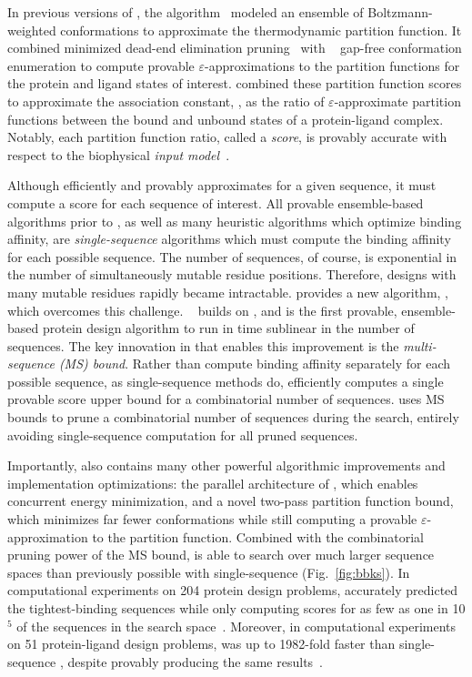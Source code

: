 \def\multisequencebound{MS\xspace}
\def\msbound{\multisequencebound}


\newcommand{\cut}[1]{}

In previous versions of \osprey, the \ks algorithm~\cite{K*} modeled an ensemble of Boltzmann-weighted conformations to approximate the thermodynamic partition function. It combined minimized dead-end elimination pruning~\cite{DEE} with \as~\cite{DEE,A*} gap-free conformation enumeration to compute provable $\varepsilon$-approximations to the partition functions for the protein and ligand states of interest. \ks combined these partition function scores to approximate the association constant, \ka, as the ratio of $\varepsilon$-approximate partition functions between the bound and unbound states of a protein-ligand complex. Notably, each partition function ratio, called a \ks \emph{score}, is provably accurate with respect to the biophysical \emph{input model}~\cite{K*,minDEE,iMinDEE}. 

Although \ks efficiently and provably approximates \ka for a given sequence, it must compute a \ks score for each sequence of interest. All provable ensemble-based algorithms prior to \bbks, as well as many heuristic algorithms which optimize binding affinity, are \emph{single-sequence} algorithms which must compute the binding affinity for each possible sequence. The number of sequences, of course, is exponential in the number of simultaneously mutable residue positions.  Therefore, designs with many mutable residues rapidly became intractable.  provides a new algorithm, \bbks, which overcomes this challenge. \bbks~\cite{BBK*} builds on \ks, and is the first provable, ensemble-based protein design algorithm to run in time sublinear in the number of sequences. The key innovation in \bbks that enables this improvement is the \emph{multi-sequence (\msbound) bound}. Rather than compute binding affinity separately for each possible sequence, as single-sequence methods do, \bbks efficiently computes a single provable \ks score upper bound for a combinatorial number of sequences. \bbks uses \msbound bounds to prune a combinatorial number of sequences during the search, entirely avoiding single-sequence computation for all pruned sequences.

Importantly, \bbks also contains many other powerful algorithmic improvements and implementation optimizations: the parallel architecture of \bbks, which enables concurrent energy minimization, and a novel two-pass partition function bound, which minimizes far fewer conformations while still computing a provable $\varepsilon$-approximation to the partition function. Combined with the combinatorial pruning power of the \msbound bound, \bbks is able to search over much larger sequence spaces than previously possible with single-sequence \ks (Fig.~\ref{fig:bbks}). In computational experiments on 204 protein design problems, \bbks accurately predicted the tightest-binding sequences while only computing \ks scores for as few as one in 10$^5$ of the sequences in the search space~\cite{BBK*}.  Moreover, in computational experiments on 51 protein-ligand design problems, \bbks was up to 1982-fold faster than single-sequence \ks, despite provably producing the same results~\cite{BBK*}.  

